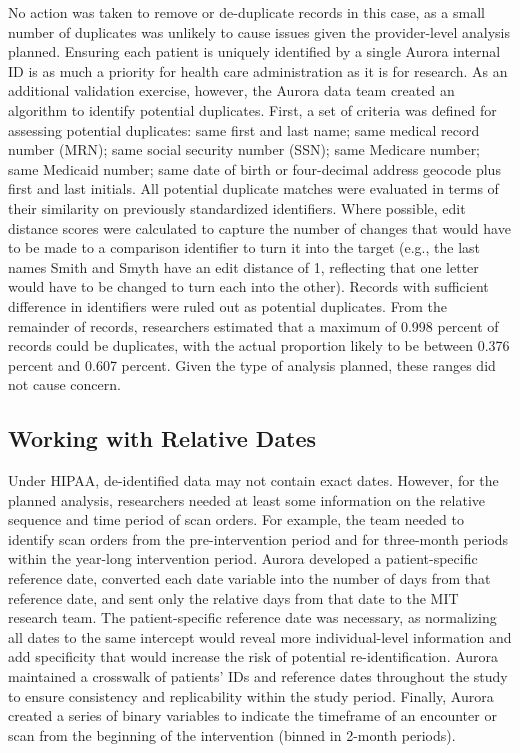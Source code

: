 No action was taken to remove or de-duplicate records in this case, as a small number of duplicates was unlikely to cause issues given the provider-level analysis planned. Ensuring each patient is uniquely identified by a single Aurora internal ID is as much a priority for health care administration as it is for research. As an additional validation exercise, however, the Aurora data team created an algorithm to identify potential duplicates. First, a set of criteria was defined for assessing potential duplicates: same first and last name; same medical record number (MRN); same social security number (SSN); same Medicare number; same Medicaid number; same date of birth or four-decimal address geocode plus first and last initials. All potential duplicate matches were evaluated in terms of their similarity on previously standardized identifiers. Where possible, edit distance scores were calculated to capture the number of changes that would have to be made to a comparison identifier to turn it into the target (e.g., the last names Smith and Smyth have an edit distance of 1, reflecting that one letter would have to be changed to turn each into the other). Records with sufficient difference in identifiers were ruled out as potential duplicates. From the remainder of records, researchers estimated that a maximum of 0.998 percent of records could be duplicates, with the actual proportion likely to be between 0.376 percent and 0.607 percent. Given the type of analysis planned, these ranges did not cause concern.

\hypertarget{working-with-relative-dates}{%
\subsection{Working with Relative Dates}\label{working-with-relative-dates}}

Under HIPAA, de-identified data may not contain exact dates. However, for the planned analysis, researchers needed at least some information on the relative sequence and time period of scan orders. For example, the team needed to identify scan orders from the pre-intervention period and for three-month periods within the year-long intervention period. Aurora developed a patient-specific reference date, converted each date variable into the number of days from that reference date, and sent only the relative days from that date to the MIT research team. The patient-specific reference date was necessary, as normalizing all dates to the same intercept would reveal more individual-level information and add specificity that would increase the risk of potential re-identification. Aurora maintained a crosswalk of patients' IDs and reference dates throughout the study to ensure consistency and replicability within the study period. Finally, Aurora created a series of binary variables to indicate the timeframe of an encounter or scan from the beginning of the intervention (binned in 2-month periods).

